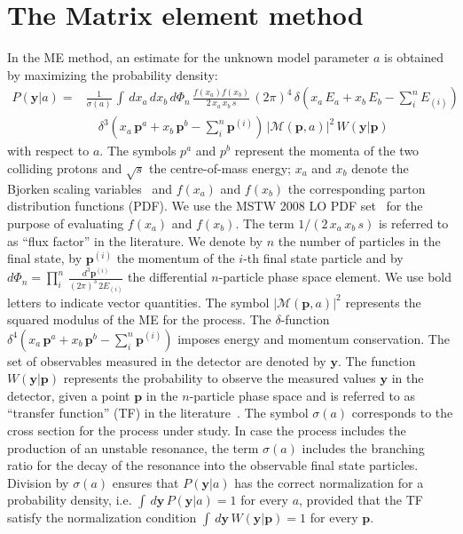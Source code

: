 \section{The Matrix element method}
\label{sec:mem}

In the ME method, an estimate for the unknown model parameter $a$
is obtained by maximizing the probability density:
\begin{align}
P(\bm{y}|a) = & \frac{1}{\sigma(a)} \, \int \, dx_{a} \, dx_{b} \,
d\Phi_{n} \, \frac{f(x_{a}) f(x_{b})}{2 \, x_{a} \, x_{b} \, s} \, (2\pi)^{4} \,
\delta( x_{a} \, E_{a} + x_{b} \, E_{b} - \sum_{i}^{n}
E_{(i)}) \, \nonumber \\
 & \quad \delta^{3}( x_{a} \, \bm{p}^{a} + x_{b} \, \bm{p}^{b} - \sum_{i}^{n}
\bm{p}^{(i)}) \, 
  \vert \mathcal{M}(\bm{p},a) \vert^{2} \, W(\bm{y}|\bm{p}) 
\label{eq:mem}
\end{align}
with respect to $a$.
The symbols $p^{a}$ and $p^{b}$ represent the momenta of the two colliding
protons and $\sqrt{s}$ the centre-of-mass energy;
$x_{a}$ and $x_{b}$ denote the Bjorken scaling variables~\cite{Bjorkenx}
and $f(x_{a})$ and $f(x_{b})$ the corresponding parton distribution
functions (PDF).
We use the MSTW 2008 LO PDF set~\cite{MSTW} for the purpose of
evaluating $f(x_{a})$ and $f(x_{b})$.
The term $1/(2 \, x_{a} \, x_{b} \, s)$ is referred to as ``flux factor'' in the literature.
We denote by $n$ the number of particles in the final state,
by $\bm{p}^{(i)}$ the momentum of the $i$-th final state particle
and by $d\Phi_{n} = \prod_{i}^{n} \,
\frac{d^{3}\bm{p}^{(i)}}{(2\pi)^{3} \, 2 E_{(i)}}$ the differential $n$-particle
phase space element.
We use bold letters to indicate vector quantities.
The symbol $\vert \mathcal{M}(\bm{p},a) \vert^{2}$ represents the
squared modulus of the ME for
the process.
The $\delta$-function $\delta^{4}( x_{a} \, \bm{p}^{a} + x_{b} \,
\bm{p}^{b} - \sum_{i}^{n} \bm{p}^{(i)})$ imposes energy and momentum
conservation.
The set of observables measured in the
detector are denoted by $\bm{y}$.
The function $W(\bm{y}|\bm{p})$ represents the probability to
observe the measured values $\bm{y}$ in the detector, given a point $\bm{p}$ in the
$n$-particle phase space and
is referred to as ``transfer function'' (TF) in the
literature~\cite{Fiedler:2010sg,Volobouev:2011vb}.
The symbol $\sigma(a)$ corresponds to the cross section for the process under study.
In case the process includes the production of an unstable resonance,
the term $\sigma(a)$ includes 
the branching ratio for the decay of the resonance into the observable final state particles.
Division by $\sigma(a)$ ensures that $P(\bm{y}|a)$ has
the correct normalization for a probability density, 
i.e. $\int \, d\bm{y} \, P(\bm{y}|a) = 1$ for every $a$, 
provided that the TF satisfy the normalization condition
$\int \, d\bm{y}\, W(\bm{y}|\bm{p}) = 1$
for every $\bm{p}$.

